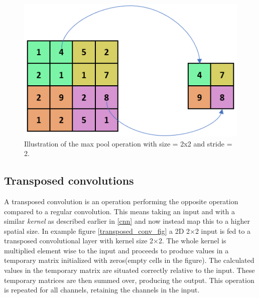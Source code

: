     \begin{figure}[H]
        \centering
        \includegraphics[scale=0.5]{figures/max_pool.png}
        \caption[The max pool operation]{Illustration of the max pool operation with size = 2x2 and stride = 2.}
      	\medskip 
        \label{maxpool_fig}
    \end{figure}
    
\subsection{Transposed convolutions}
    A transposed convolution is an operation performing the opposite operation compared to a regular convolution\cite{dumoulin2016guide_transposed_convolution}. This means taking an input and with a similar \textit{kernel} as described earlier in \ref{cnn} and now instead map this to a higher spatial size. In example figure \ref{transposed_conv_fig} a 2D 2×2 input is fed to a transposed convolutional layer with kernel size 2×2. The whole kernel is multiplied element wise to the input and proceeds to produce values in a temporary matrix initialized with zeros(empty cells in the figure). The calculated values in the temporary matrix are situated correctly relative to the input. These temporary matrices are then summed over, producing the output. This operation is repeated for all channels, retaining the channels in the input.
    
